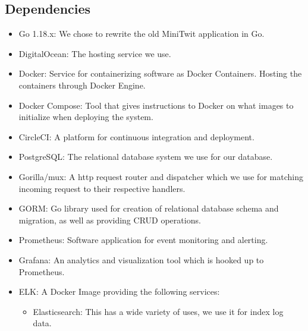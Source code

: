 \subsection{Dependencies}
\begin{itemize}
    \item Go 1.18.x: We chose to rewrite the old MiniTwit application in Go. 
    \vspace{0.5em}
    \item DigitalOcean: The hosting service we use.
    \vspace{0.5em}
    \item Docker: Service for containerizing software as Docker Containers. Hosting the containers through Docker Engine. 
    \vspace{0.5em}
    \item Docker Compose: Tool that gives instructions to Docker on what images to initialize when deploying the system. 
    \vspace{0.5em}
    \item CircleCI: A platform for continuous integration and deployment.
    \vspace{0.5em}
    \item PostgreSQL: The relational database system we use for our database. \vspace{0.5em}
    \item Gorilla/mux: A http request router and dispatcher which we use for matching incoming request to their respective handlers. 
    \vspace{0.5em}
    \item GORM: Go library used for creation of relational database schema and migration, as well as providing CRUD operations. 
    \vspace{0.5em}
    \item Prometheus: Software application for event monitoring and alerting. 
    \vspace{0.5em}
    \item Grafana: An analytics and visualization tool which is hooked up to Prometheus.
    \vspace{0.5em}
    \item ELK: A Docker Image providing the following services: 
    \vspace{0.5em}
    \begin{itemize}
        \item Elasticsearch: This has a wide variety of uses, we use it for index log data.
        \vspace{0.5em}

\end{itemize}
\end{itemize}
